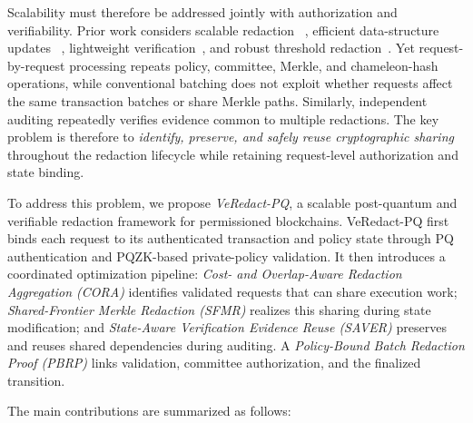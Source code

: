 \documentclass[lettersize,journal]{IEEEtran}
\begin{document}
Scalability must therefore be addressed jointly with authorization and
verifiability. Prior work considers scalable redaction
~\cite{ref14,ref21,ref26}, efficient data-structure updates
~\cite{ref23}, lightweight verification~\cite{ref20}, and robust
threshold redaction~\cite{ref27}. Yet request-by-request processing
repeats policy, committee, Merkle, and chameleon-hash operations, while
conventional batching does not exploit whether requests affect the same
transaction batches or share Merkle paths. Similarly, independent
auditing repeatedly verifies evidence common to multiple redactions.
The key problem is therefore to \emph{identify, preserve, and safely
reuse cryptographic sharing} throughout the redaction lifecycle while
retaining request-level authorization and state binding.

To address this problem, we propose \emph{VeRedact-PQ}, a scalable
post-quantum and verifiable redaction framework for permissioned
blockchains. VeRedact-PQ first binds each request to its authenticated
transaction and policy state through PQ authentication and PQZK-based
private-policy validation. It then introduces a coordinated optimization
pipeline: \emph{Cost- and Overlap-Aware Redaction Aggregation (CORA)}
identifies validated requests that can share execution work;
\emph{Shared-Frontier Merkle Redaction (SFMR)} realizes this sharing
during state modification; and \emph{State-Aware Verification Evidence
Reuse (SAVER)} preserves and reuses shared dependencies during auditing.
A \emph{Policy-Bound Batch Redaction Proof (PBRP)} links validation,
committee authorization, and the finalized transition.

The main contributions are summarized as follows:
\end{document}
